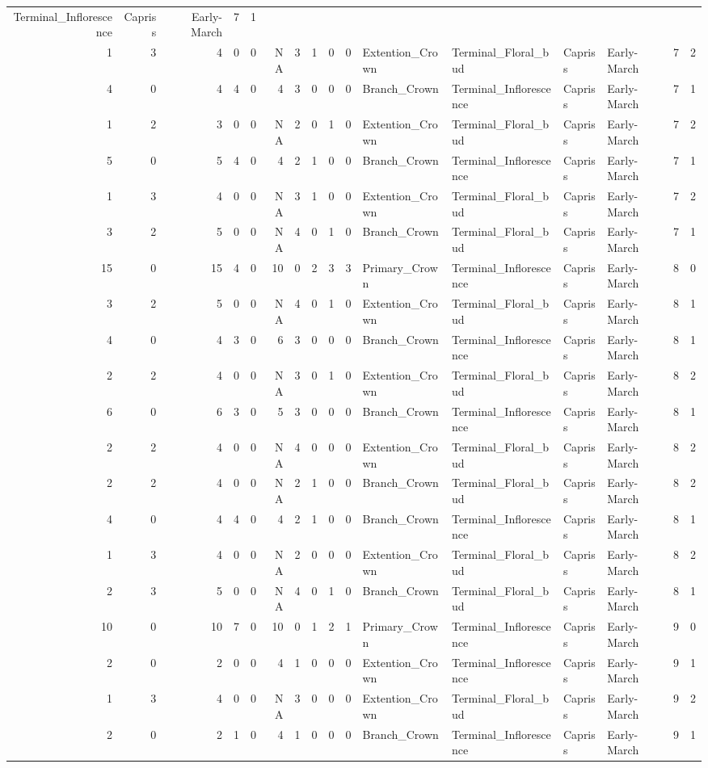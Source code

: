 \documentclass[]{article}
\begin{document}
\begin{longtable}[]{@{}rrrrrrrrrrllllrl@{}}
Terminal\_Inflorescence & Capriss & Early-March & 7 & 1\tabularnewline
1 & 3 & 4 & 0 & 0 & NA & 3 & 1 & 0 & 0 & Extention\_Crown &
Terminal\_Floral\_bud & Capriss & Early-March & 7 & 2\tabularnewline
4 & 0 & 4 & 4 & 0 & 4 & 3 & 0 & 0 & 0 & Branch\_Crown &
Terminal\_Inflorescence & Capriss & Early-March & 7 & 1\tabularnewline
1 & 2 & 3 & 0 & 0 & NA & 2 & 0 & 1 & 0 & Extention\_Crown &
Terminal\_Floral\_bud & Capriss & Early-March & 7 & 2\tabularnewline
5 & 0 & 5 & 4 & 0 & 4 & 2 & 1 & 0 & 0 & Branch\_Crown &
Terminal\_Inflorescence & Capriss & Early-March & 7 & 1\tabularnewline
1 & 3 & 4 & 0 & 0 & NA & 3 & 1 & 0 & 0 & Extention\_Crown &
Terminal\_Floral\_bud & Capriss & Early-March & 7 & 2\tabularnewline
3 & 2 & 5 & 0 & 0 & NA & 4 & 0 & 1 & 0 & Branch\_Crown &
Terminal\_Floral\_bud & Capriss & Early-March & 7 & 1\tabularnewline
15 & 0 & 15 & 4 & 0 & 10 & 0 & 2 & 3 & 3 & Primary\_Crown &
Terminal\_Inflorescence & Capriss & Early-March & 8 & 0\tabularnewline
3 & 2 & 5 & 0 & 0 & NA & 4 & 0 & 1 & 0 & Extention\_Crown &
Terminal\_Floral\_bud & Capriss & Early-March & 8 & 1\tabularnewline
4 & 0 & 4 & 3 & 0 & 6 & 3 & 0 & 0 & 0 & Branch\_Crown &
Terminal\_Inflorescence & Capriss & Early-March & 8 & 1\tabularnewline
2 & 2 & 4 & 0 & 0 & NA & 3 & 0 & 1 & 0 & Extention\_Crown &
Terminal\_Floral\_bud & Capriss & Early-March & 8 & 2\tabularnewline
6 & 0 & 6 & 3 & 0 & 5 & 3 & 0 & 0 & 0 & Branch\_Crown &
Terminal\_Inflorescence & Capriss & Early-March & 8 & 1\tabularnewline
2 & 2 & 4 & 0 & 0 & NA & 4 & 0 & 0 & 0 & Extention\_Crown &
Terminal\_Floral\_bud & Capriss & Early-March & 8 & 2\tabularnewline
2 & 2 & 4 & 0 & 0 & NA & 2 & 1 & 0 & 0 & Branch\_Crown &
Terminal\_Floral\_bud & Capriss & Early-March & 8 & 2\tabularnewline
4 & 0 & 4 & 4 & 0 & 4 & 2 & 1 & 0 & 0 & Branch\_Crown &
Terminal\_Inflorescence & Capriss & Early-March & 8 & 1\tabularnewline
1 & 3 & 4 & 0 & 0 & NA & 2 & 0 & 0 & 0 & Extention\_Crown &
Terminal\_Floral\_bud & Capriss & Early-March & 8 & 2\tabularnewline
2 & 3 & 5 & 0 & 0 & NA & 4 & 0 & 1 & 0 & Branch\_Crown &
Terminal\_Floral\_bud & Capriss & Early-March & 8 & 1\tabularnewline
10 & 0 & 10 & 7 & 0 & 10 & 0 & 1 & 2 & 1 & Primary\_Crown &
Terminal\_Inflorescence & Capriss & Early-March & 9 & 0\tabularnewline
2 & 0 & 2 & 0 & 0 & 4 & 1 & 0 & 0 & 0 & Extention\_Crown &
Terminal\_Inflorescence & Capriss & Early-March & 9 & 1\tabularnewline
1 & 3 & 4 & 0 & 0 & NA & 3 & 0 & 0 & 0 & Extention\_Crown &
Terminal\_Floral\_bud & Capriss & Early-March & 9 & 2\tabularnewline
2 & 0 & 2 & 1 & 0 & 4 & 1 & 0 & 0 & 0 & Branch\_Crown &
Terminal\_Inflorescence & Capriss & Early-March & 9 & 1\tabularnewline

\end{longtable}
\end{document}
